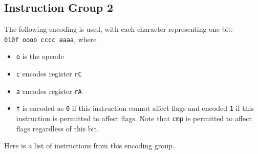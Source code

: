 \documentclass{article}
\begin{document}
	\doublespacing

	\subsection{Instruction Group 2}
	The following encoding is used, with each character representing one
	bit:  \\
	\texttt{010f oooo cccc aaaa}, where

	\singlespacing
	\begin{itemize}
		\item \texttt{o} is the opcode
		\item \texttt{c} encodes register \texttt{rC}
		\item \texttt{a} encodes register \texttt{rA}
		\item \texttt{f} is encoded as \texttt{0} if this instruction
		cannot affect flags and encoded \texttt{1} if this instruction is
		permitted to affect flags.  Note that \texttt{cmp} is permitted to
		affect flags regardless of this bit.
	\end{itemize}
	\doublespacing

	Here is a list of instructions from this encoding group.
\end{document}
